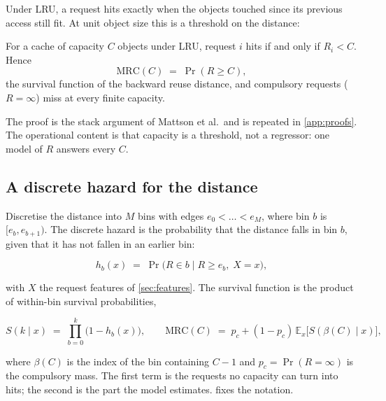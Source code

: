 Under LRU, a request hits exactly when the objects touched since its previous access
still fit. At unit object size this is a threshold on the distance:

\begin{proposition}\label{prop:lru}
For a cache of capacity $C$ objects under LRU, request $i$ hits if and only if
$R_i < C$. Hence
\begin{equation}\label{eq:mrc}
  \mathrm{MRC}(C) \;=\; \Pr(R \ge C),
\end{equation}
the survival function of the backward reuse distance, and compulsory requests
($R=\infty$) miss at every finite capacity.
\end{proposition}

The proof is the stack argument of Mattson et al.\ and is repeated in
\cref{app:proofs}. The operational content is that capacity is a threshold, not a
regressor: one model of $R$ answers every $C$.

\subsection{A discrete hazard for the distance}
\label{sec:hazard}

Discretise the distance into $M$ bins with edges $e_0<\dots<e_M$, where bin $b$ is
$[e_b,e_{b+1})$. The discrete hazard is the probability that the distance falls in
bin $b$, given that it has not fallen in an earlier bin:

\begin{equation}\label{eq:hazard}
  h_b(x) \;=\; \Pr\bigl(R\in b \;\big|\; R\ge e_b,\; X=x\bigr),
\end{equation}

with $X$ the request features of \cref{sec:features}. The survival function is the
product of within-bin survival probabilities,

\begin{equation}\label{eq:survival}
  S(k\mid x) \;=\; \prod_{b=0}^{k}\bigl(1-h_b(x)\bigr),
  \qquad
  \mathrm{MRC}(C) \;=\; p_c + (1-p_c)\,\mathbb{E}_x\bigl[S(\beta(C)\mid x)\bigr],
\end{equation}

where $\beta(C)$ is the index of the bin containing $C-1$ and $p_c=\Pr(R=\infty)$ is
the compulsory mass. The first term is the requests no capacity can turn into hits;
the second is the part the model estimates.  fixes the
notation.

